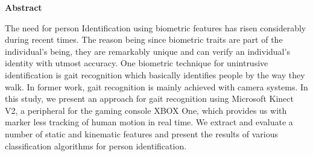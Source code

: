\begin{center}
\begin{huge}
\bfseries{Abstract}
\end{huge}
\end{center}
\noindent The need for person Identification using biometric features has risen considerably during recent times. The reason being since biometric traits are part of the individual’s being, they are remarkably unique and can verify an individual’s identity with utmost accuracy. One biometric technique for unintrusive identification is gait recognition which basically identifies people by the way they walk. In former work, gait recognition is mainly achieved with camera systems. In this study, we present an approach for gait recognition using Microsoft Kinect V2, a peripheral for the gaming console XBOX One, which provides us with marker less tracking of human motion in real time. We extract and evaluate a number of static and kinematic features and present the results of various classification algorithms for person identification.
\pagebreak
